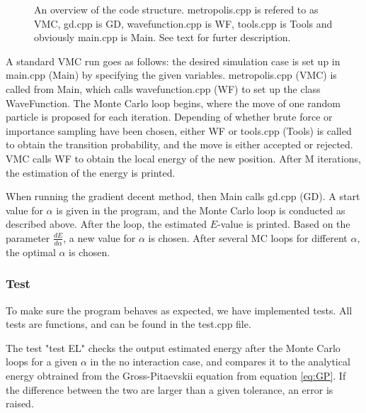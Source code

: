 \documentclass[norsk,a4paper,12pt]{article}
\begin{document}
\begin{figure}[H]
\centering
{}
\caption{An overview of the code structure. metropolis.cpp is refered to as VMC, gd.cpp is GD, wavefunction.cpp is WF, tools.cpp is Tools and obviously main.cpp is Main. See text for furter description.}
\label{fig:code_structure}
\end{figure}
 A standard VMC run goes as follows: the desired simulation case is set up in main.cpp (Main) by specifying the given variables. metropolis.cpp (VMC) is called from Main, which calls wavefunction.cpp (WF) to set up the class WaveFunction. The Monte Carlo loop begins, where the move of one random particle is proposed for each iteration. Depending of whether brute force or importance sampling have been chosen, either WF or tools.cpp (Tools) is called to obtain the transition probability, and the move is either accepted or rejected. VMC calls WF to obtain the local energy of the new position. After M iterations, the estimation of the energy is printed. \par
 When running the gradient decent method, then Main calls gd.cpp (GD). A start value for $\alpha$ is given in the program, and the Monte Carlo loop is conducted as described above. After the loop, the estimated $E$-value is printed. Based on the parameter $\frac{d E}{d \alpha}$, a new value for $\alpha$ is chosen. After several MC loops for different $\alpha$, the optimal $\alpha$ is chosen. 
 
 \subsubsection{Test}
To make sure the program behaves as expected, we have implemented tests. All tests are functions, and can be found in the test.cpp file.

The test "test EL" checks the output estimated energy after the Monte Carlo loops for a given $\alpha$ in the no interaction case, and compares it to the analytical energy obtrained from the Gross-Pitaevskii equation from equation \ref{eq:GP}. If the difference between the two are larger than a given tolerance, an error is raised.
\end{document}
